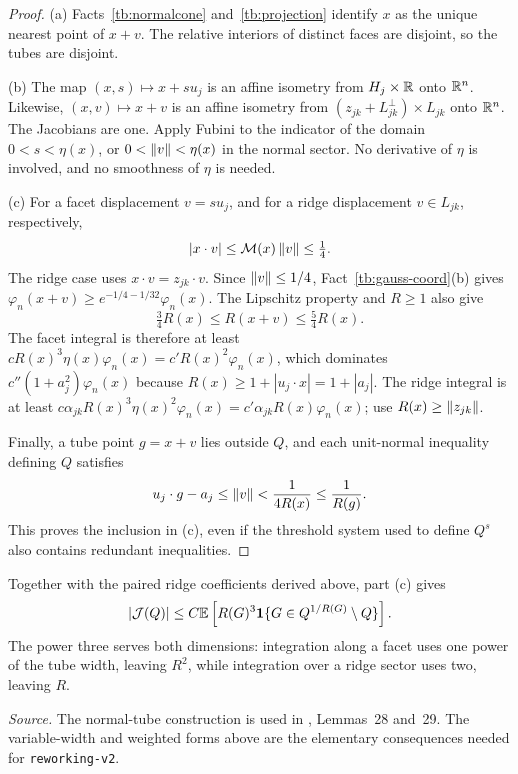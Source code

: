 \documentclass[11pt,letterpaper]{article}
\theoremstyle{plain}
\begin{document}
\begin{proof}
(a) Facts~\ref{tb:normalcone} and~\ref{tb:projection} identify \(x\)
as the unique nearest point of \(x+v\). The relative interiors of
distinct faces are disjoint, so the tubes are disjoint.

(b) The map \((x,s)\mapsto x+s u_j\) is an affine isometry from
\(H_j\times\mathbb R\) onto \(\mathbb R^n\). Likewise, \((x,v)\mapsto x+v\)
is an affine isometry from \((z_{jk}+L_{jk}^\perp)\times L_{jk}\)
onto \(\mathbb R^n\). The Jacobians are one. Apply Fubini to the indicator
of the domain \(0<s<\eta(x)\), or \(0<\left\lVert v\right\rVert<\eta(x)\) in the
normal sector. No derivative of \(\eta\) is involved, and no
smoothness of \(\eta\) is needed.

(c) For a facet displacement \(v=s u_j\), and for a ridge displacement
\(v\in L_{jk}\), respectively,
\[
 |x\cdot v|\le\mathcal M(x)\left\lVert v\right\rVert\le\tfrac14.
\]
The ridge case uses \(x\cdot v=z_{jk}\cdot v\). Since
\(\left\lVert v\right\rVert\le1/4\), Fact~\ref{tb:gauss-coord}(b) gives
\(\varphi_n(x+v)\ge e^{-1/4-1/32}\varphi_n(x)\).
The Lipschitz property and \(R\ge1\) also give
\[
 \tfrac34R(x)\le R(x+v)\le\tfrac54R(x).
\]
The facet integral is therefore at least
\(cR(x)^3\eta(x)\varphi_n(x)=c'R(x)^2\varphi_n(x)\), which
dominates \(c''(1+a_j^2)\varphi_n(x)\) because
\(R(x)\ge1+|u_j\cdot x|=1+|a_j|\). The ridge integral is at least
\(c\alpha_{jk}R(x)^3\eta(x)^2\varphi_n(x)
=c'\alpha_{jk}R(x)\varphi_n(x)\); use
\(R(x)\ge\left\lVert z_{jk}\right\rVert\).

Finally, a tube point \(g=x+v\) lies outside \(Q\), and each
unit-normal inequality defining \(Q\) satisfies
\[
 u_j\cdot g-a_j\le\left\lVert v\right\rVert<\frac1{4R(x)}\le\frac1{R(g)}.
\]
This proves the inclusion in (c), even if the threshold system used
to define \(Q^s\) also contains redundant inequalities.
\end{proof}

Together with the paired ridge coefficients derived above, part (c)
gives
\[
 |\mathcal J(Q)|\le C\mathbb E\left[R(G)^3
              \mathbf 1\{G\in Q^{1/R(G)}\setminus Q\}\right].
\]
The power three serves both dimensions: integration along a facet
uses one power of the tube width, leaving \(R^2\), while integration
over a ridge sector uses two, leaving \(R\).

\emph{Source.} The normal-tube construction is used in ,
Lemmas~28 and~29. The variable-width and weighted forms above are
the elementary consequences needed for \texttt{reworking-v2}.
\end{document}
